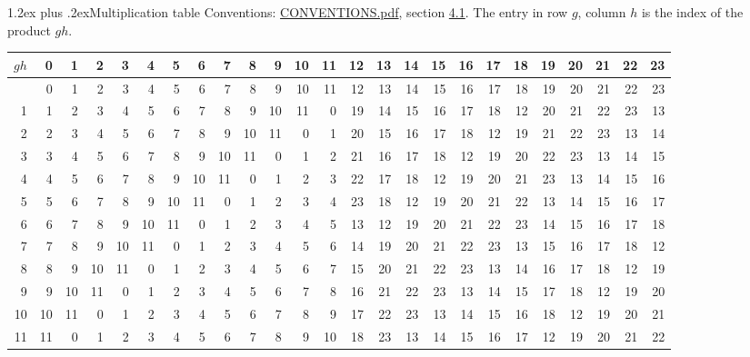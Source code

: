 \documentclass[10pt,a4paper]{article}
\makeatletter
\renewcommand\section{\@startsection{section}{1}{\z@}{-3ex plus -1ex minus -.2ex}%
  {1.2ex plus .2ex}{\normalfont\large\sffamily\bfseries\color{parttitle}}}
\numberwithin{equation}{section}
\makeatother
\begin{document}
\section{Multiplication table}\label{s:multiplication}
Conventions: \href{../../CONVENTIONS.pdf}{CONVENTIONS.pdf}, section \href{../../CONVENTIONS.pdf\#conv.4.1}{4.1}.
The entry in row $g$, column $h$ is the index of the product $gh$.
{\normalsize\setlength{\tabcolsep}{0.1em}\setlength{\LTleft}{-8pt plus 1fill}\setlength{\LTright}{-8pt plus 1fill}\begin{longtable}{@{}r|rrrrrrrrrrrrrrrrrrrrrrrr@{}}\toprule
$gh$ & 0 & 1 & 2 & 3 & 4 & 5 & 6 & 7 & 8 & 9 & 10 & 11 & 12 & 13 & 14 & 15 & 16 & 17 & 18 & 19 & 20 & 21 & 22 & 23\\\midrule\endhead
\bottomrule\endfoot\endlastfoot
0 & 0 & 1 & 2 & 3 & 4 & 5 & 6 & 7 & 8 & 9 & 10 & 11 & 12 & 13 & 14 & 15 & 16 & 17 & 18 & 19 & 20 & 21 & 22 & 23\\*
1 & 1 & 2 & 3 & 4 & 5 & 6 & 7 & 8 & 9 & 10 & 11 & 0 & 19 & 14 & 15 & 16 & 17 & 18 & 12 & 20 & 21 & 22 & 23 & 13\\
2 & 2 & 3 & 4 & 5 & 6 & 7 & 8 & 9 & 10 & 11 & 0 & 1 & 20 & 15 & 16 & 17 & 18 & 12 & 19 & 21 & 22 & 23 & 13 & 14\\
3 & 3 & 4 & 5 & 6 & 7 & 8 & 9 & 10 & 11 & 0 & 1 & 2 & 21 & 16 & 17 & 18 & 12 & 19 & 20 & 22 & 23 & 13 & 14 & 15\\
4 & 4 & 5 & 6 & 7 & 8 & 9 & 10 & 11 & 0 & 1 & 2 & 3 & 22 & 17 & 18 & 12 & 19 & 20 & 21 & 23 & 13 & 14 & 15 & 16\\
5 & 5 & 6 & 7 & 8 & 9 & 10 & 11 & 0 & 1 & 2 & 3 & 4 & 23 & 18 & 12 & 19 & 20 & 21 & 22 & 13 & 14 & 15 & 16 & 17\\
6 & 6 & 7 & 8 & 9 & 10 & 11 & 0 & 1 & 2 & 3 & 4 & 5 & 13 & 12 & 19 & 20 & 21 & 22 & 23 & 14 & 15 & 16 & 17 & 18\\
7 & 7 & 8 & 9 & 10 & 11 & 0 & 1 & 2 & 3 & 4 & 5 & 6 & 14 & 19 & 20 & 21 & 22 & 23 & 13 & 15 & 16 & 17 & 18 & 12\\
8 & 8 & 9 & 10 & 11 & 0 & 1 & 2 & 3 & 4 & 5 & 6 & 7 & 15 & 20 & 21 & 22 & 23 & 13 & 14 & 16 & 17 & 18 & 12 & 19\\
9 & 9 & 10 & 11 & 0 & 1 & 2 & 3 & 4 & 5 & 6 & 7 & 8 & 16 & 21 & 22 & 23 & 13 & 14 & 15 & 17 & 18 & 12 & 19 & 20\\
10 & 10 & 11 & 0 & 1 & 2 & 3 & 4 & 5 & 6 & 7 & 8 & 9 & 17 & 22 & 23 & 13 & 14 & 15 & 16 & 18 & 12 & 19 & 20 & 21\\
11 & 11 & 0 & 1 & 2 & 3 & 4 & 5 & 6 & 7 & 8 & 9 & 10 & 18 & 23 & 13 & 14 & 15 & 16 & 17 & 12 & 19 & 20 & 21 & 22\\

\end{longtable}}
\end{document}
